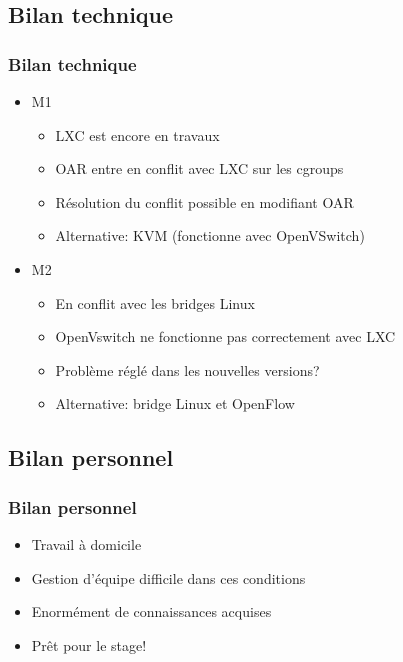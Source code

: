 \documentclass{beamer}
\begin{document}
	  \subsection{Bilan technique}
	    \begin{frame}
        \frametitle{Bilan technique}
		    \begin{itemize}
		      \item M1
		      \begin{itemize}
		        \item LXC est encore en travaux 
		        \item OAR entre en conflit avec LXC sur les cgroups
   		      \item Résolution du conflit possible en modifiant OAR
   		      \item Alternative: KVM (fonctionne avec OpenVSwitch) 
		      \end{itemize}
		      \item M2
		      \begin{itemize}
		        \item En conflit avec les bridges Linux
		        \item OpenVswitch ne fonctionne pas correctement avec LXC
		        \item Problème réglé dans les nouvelles versions?
		        \item Alternative: bridge Linux et OpenFlow
		      \end{itemize}
		    \end{itemize}
	    \end{frame}
	    
	  \subsection{Bilan personnel} 
	    \begin{frame}
        \frametitle{Bilan personnel}
		    \begin{itemize}
		      \item Travail à domicile
		      \item Gestion d'équipe difficile dans ces conditions
		      \item Enormément de connaissances acquises
		      \item Prêt pour le stage!
		    \end{itemize}
	    \end{frame}
		
\end{document}

